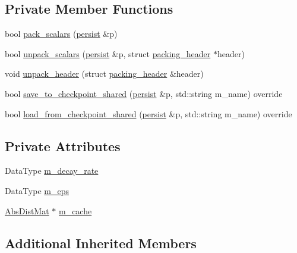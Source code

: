 \subsection*{Private Member Functions}
\begin{DoxyCompactItemize}
\item 
bool \hyperlink{classlbann_1_1rmsprop_ac2c5ae4dc2438da1da54072a297b148b}{pack\+\_\+scalars} (\hyperlink{classlbann_1_1persist}{persist} \&p)
\item 
bool \hyperlink{classlbann_1_1rmsprop_a9b969263276b4d1aed93c3c82abf832d}{unpack\+\_\+scalars} (\hyperlink{classlbann_1_1persist}{persist} \&p, struct \hyperlink{structlbann_1_1rmsprop_1_1packing__header}{packing\+\_\+header} $\ast$header)
\item 
void \hyperlink{classlbann_1_1rmsprop_a1af03b4c5e744abae04ccec3e19a0cc6}{unpack\+\_\+header} (struct \hyperlink{structlbann_1_1rmsprop_1_1packing__header}{packing\+\_\+header} \&header)
\item 
bool \hyperlink{classlbann_1_1rmsprop_a8abe698168c2d1cb2c65d180552501ef}{save\+\_\+to\+\_\+checkpoint\+\_\+shared} (\hyperlink{classlbann_1_1persist}{persist} \&p, std\+::string m\+\_\+name) override
\item 
bool \hyperlink{classlbann_1_1rmsprop_a64db08f787ca8904a0ba4ecc37d5d1ed}{load\+\_\+from\+\_\+checkpoint\+\_\+shared} (\hyperlink{classlbann_1_1persist}{persist} \&p, std\+::string m\+\_\+name) override
\end{DoxyCompactItemize}
\subsection*{Private Attributes}
\begin{DoxyCompactItemize}
\item 
Data\+Type \hyperlink{classlbann_1_1rmsprop_a9cd712c44e7c4995120e2933b0387d71}{m\+\_\+decay\+\_\+rate}
\item 
Data\+Type \hyperlink{classlbann_1_1rmsprop_a6ea73caf5b2769451dfd798665877208}{m\+\_\+eps}
\item 
\hyperlink{base_8hpp_a9a697a504ae84010e7439ffec862b470}{Abs\+Dist\+Mat} $\ast$ \hyperlink{classlbann_1_1rmsprop_a2bbaa35bb209e971a5ac9e1dbb6ece76}{m\+\_\+cache}
\end{DoxyCompactItemize}
\subsection*{Additional Inherited Members}


